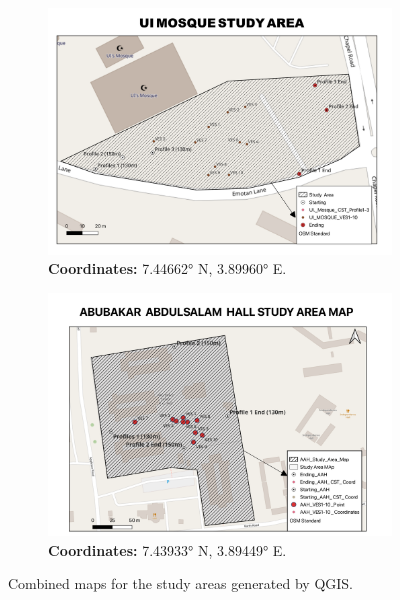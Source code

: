 \documentclass[12pt,a4paper]{report}
\begin{document}
\begin{figure}[H]
    \centering
    \begin{subfigure}[t]{1.0\textwidth}
        \centering
        \includegraphics[width=\textwidth]{UI_Mosque_Map_Layout.png}
        \caption{\textbf{Coordinates:} 7.44662° N, 3.89960° E.}
        \label{fig:UI Mosque Study Area}
    \end{subfigure} 
    \begin{subfigure}[t]{1.0\textwidth}
        \centering
        \includegraphics[width=\textwidth]{AAH_Map_Layout.png}
        \caption{\textbf{Coordinates:} 7.43933° N, 3.89449° E.}
        \label{fig:AAH Study Area}
    \end{subfigure}
    \caption{Combined maps for the study areas generated by QGIS.}
    \label{fig:Combined Study Areas}
\end{figure}
\end{document}
